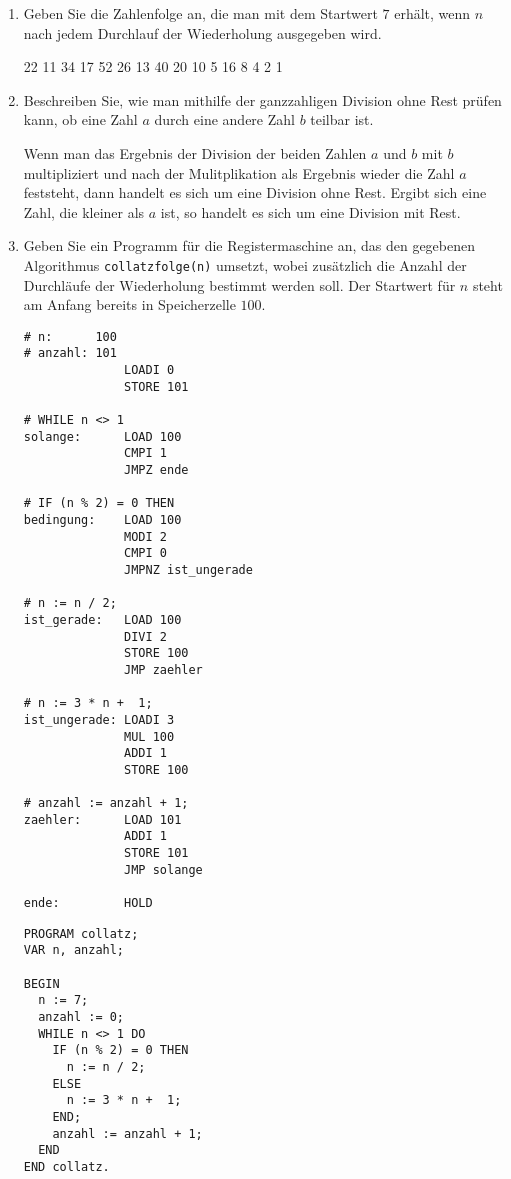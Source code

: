 \documentclass{lehramt-informatik-aufgabe}
\begin{document}
\begin{enumerate}


\item Geben Sie die Zahlenfolge an, die man mit dem Startwert $7$
erhält, wenn $n$ nach jedem Durchlauf der Wiederholung ausgegeben wird.

\begin{liAntwort}
22
11
34
17
52
26
13
40
20
10
5
16
8
4
2
1
\end{liAntwort}


\item Beschreiben Sie, wie man mithilfe der ganzzahligen Division ohne
Rest prüfen kann, ob eine Zahl $a$ durch eine andere Zahl $b$ teilbar
ist.

\begin{liAntwort}
Wenn man das Ergebnis der Division der beiden Zahlen $a$ und $b$ mit $b$
multipliziert und nach der Mulitplikation als Ergebnis wieder die Zahl
$a$ feststeht, dann handelt es sich um eine Division ohne Rest. Ergibt
sich eine Zahl, die kleiner als $a$ ist, so handelt es sich um eine
Division mit Rest.
\end{liAntwort}


\item Geben Sie ein Programm für die Registermaschine an, das den
gegebenen Algorithmus \texttt{collatzfolge(n)} umsetzt, wobei zusätzlich
die Anzahl der Durchläufe der Wiederholung bestimmt werden soll. Der
Startwert für $n$ steht am Anfang bereits in Speicherzelle $100$.


\begin{verbatim}
# n:      100
# anzahl: 101
              LOADI 0
              STORE 101

# WHILE n <> 1
solange:      LOAD 100
              CMPI 1
              JMPZ ende

# IF (n % 2) = 0 THEN
bedingung:    LOAD 100
              MODI 2
              CMPI 0
              JMPNZ ist_ungerade

# n := n / 2;
ist_gerade:   LOAD 100
              DIVI 2
              STORE 100
              JMP zaehler

# n := 3 * n +  1;
ist_ungerade: LOADI 3
              MUL 100
              ADDI 1
              STORE 100

# anzahl := anzahl + 1;
zaehler:      LOAD 101
              ADDI 1
              STORE 101
              JMP solange

ende:         HOLD
\end{verbatim}

\begin{verbatim}
PROGRAM collatz;
VAR n, anzahl;

BEGIN
  n := 7;
  anzahl := 0;
  WHILE n <> 1 DO
    IF (n % 2) = 0 THEN
      n := n / 2;
    ELSE
      n := 3 * n +  1;
    END;
    anzahl := anzahl + 1;
  END
END collatz.
\end{verbatim}
\end{enumerate}
\end{document}
